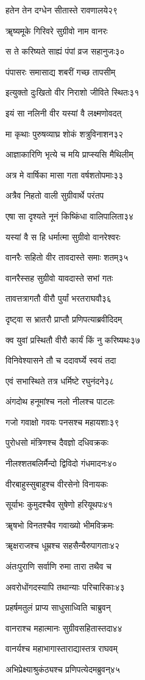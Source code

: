 हतेन तेन दग्धेन सीतास्ते रावणालये२९

ॠष्यमूके गिरिवरे सुग्रीवो नाम वानरः

स ते करिष्यते साह्यं पंपां व्रज सहानुजः३०

पंपासरः समासाद्य शबरीं गच्छ तापसीम्

इत्युक्तो दुःखितो वीर निराशो जीविते स्थितः३१

इयं सा नलिनी वीर यस्यां वै लक्ष्मणोवदत्

मा कृथाः पुरुषव्याघ्र शोकं शत्रुविनाशन३२

आज्ञाकारिणि भृत्ये च मयि प्राप्स्यसि मैथिलीम्

अत्र मे वार्षिका मासा गता वर्षशतोपमाः३३

अत्रैव निहतो वाली सुग्रीवार्थे परंतप

एषा सा दृश्यते नूनं किष्किंधा वालिपालिता३४

यस्यां वै स हि धर्मात्मा सुग्रीवो वानरेश्वरः

वानरैः सहितो वीर तावदास्ते समाः शतम्३५

वानरैस्सह सुग्रीवो यावदास्ते सभां गतः

तावत्तत्रागतौ वीरौ पुर्यां भरतराघवौ३६

दृष्ट्वा स भ्रातरौ प्राप्तौ प्रणिपत्याब्रवीदिदम्

क्व युवां प्रस्थितौ वीरौ कार्यं किं नु करिष्यथः३७

विनिवेश्यासने तौ च ददावर्घ्ये स्वयं तदा

एवं सभास्थिते तत्र धर्मिष्टे रघुनंदने३८

अंगदोथ हनूमांश्च नलो नीलश्च पाटलः

गजो गवाक्षो गवयः पनसश्च महायशाः३९

पुरोधसो मंत्रिणश्च दैवज्ञो दधिवक्रकः

नीलश्शतबलिर्मैन्दो द्विविदो गंधमादनः४०

वीरबाहुस्सुबाहुश्च वीरसेनो विनायकः

सूर्याभः कुमुदश्चैव सुषेणो हरियूथपः४१

ॠषभो विनतश्चैव गवाख्यो भीमविक्रमः

ॠक्षराजश्च धूम्रश्च सहसैन्यैरुपागताः४२

अंतःपुराणि सर्वाणि रुमा तारा तथैव च

अवरोधोंगदस्यापि तथान्याः परिचारिकाः४३

प्रहर्षमतुलं प्राप्य साधुसाध्विति चाब्रुवन्

वानराश्च महात्मानः सुग्रीवसहितास्तदा४४

वानर्यश्च महाभागास्ताराद्यास्तत्र राघवम्

अभिप्रेक्ष्याश्रुकंठ्यश्च प्रणिपत्येदमब्रुवन्४५

